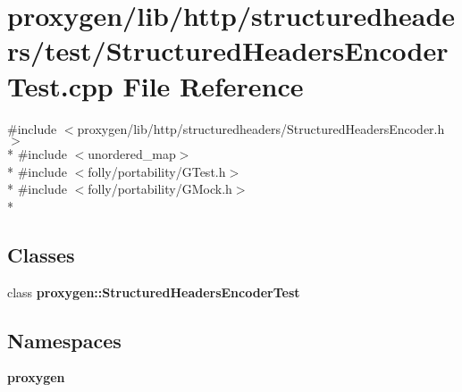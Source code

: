 \section{proxygen/lib/http/structuredheaders/test/\+Structured\+Headers\+Encoder\+Test.cpp File Reference}
\label{StructuredHeadersEncoderTest_8cpp}
{\ttfamily \#include $<$proxygen/lib/http/structuredheaders/\+Structured\+Headers\+Encoder.\+h$>$}\\*
{\ttfamily \#include $<$unordered\+\_\+map$>$}\\*
{\ttfamily \#include $<$folly/portability/\+G\+Test.\+h$>$}\\*
{\ttfamily \#include $<$folly/portability/\+G\+Mock.\+h$>$}\\*
\subsection*{Classes}
\begin{DoxyCompactItemize}
\item 
class {\bf proxygen\+::\+Structured\+Headers\+Encoder\+Test}
\end{DoxyCompactItemize}
\subsection*{Namespaces}
\begin{DoxyCompactItemize}
\item 
 {\bf proxygen}
\end{DoxyCompactItemize}
